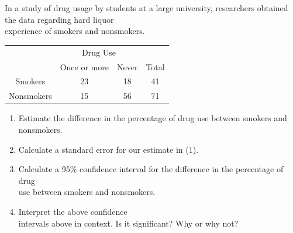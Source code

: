 \documentclass[11pt, chapterprefix=true]{scrbook}\usepackage[]{graphicx}\usepackage[]{color}
\begin{document}
\twocolumn

\section{}

\begin{exercises}
\begin{exercise}  %

In a study of drug usage by students at a large university, researchers obtained the data regarding hard liquor \\ experience of smokers and nonsmokers.

\begin{table}[ht]
\centering
{\small{
\begin{tabular}{@{} cccc @{}} \hline
 & \multicolumn{2}{c}{Drug Use} \\
 & Once or more & Never & Total \\ \hline
Smokers & 23 & 18 & 41 \\
Nonsmokers & 15 & 56 & 71 \\ \hline
\end{tabular}
}}
\end{table}

\begin{enumerate}
\item Estimate the difference in the percentage of drug use between smokers and nonsmokers.
\item Calculate a standard error for our estimate in (1).
\item Calculate a 95\% confidence interval for the difference in the percentage of drug \\ use between smokers and nonsmokers.
\item Interpret the above confidence \\ intervals above in context.
Is it significant? Why or why not?
\end{enumerate}


\end{exercise}
\end{exercises}
\end{document}
